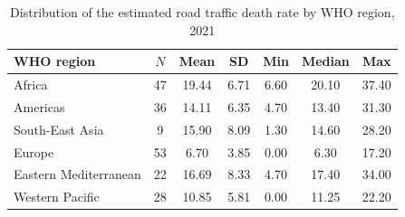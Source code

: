 \begin{table}[t]
\centering
\begin{threeparttable}
\caption{Distribution of the estimated road traffic death rate by WHO region, 2021}
\label{tab:regions}
\begin{tabular}{lcccccc}
\toprule
WHO region & $N$ & Mean & SD & Min & Median & Max \\
\midrule
Africa & 47 & 19.44 & 6.71 & 6.60 & 20.10 & 37.40 \\
Americas & 36 & 14.11 & 6.35 & 4.70 & 13.40 & 31.30 \\
South-East Asia & 9 & 15.90 & 8.09 & 1.30 & 14.60 & 28.20 \\
Europe & 53 & 6.70 & 3.85 & 0.00 & 6.30 & 17.20 \\
Eastern Mediterranean & 22 & 16.69 & 8.33 & 4.70 & 17.40 & 34.00 \\
Western Pacific & 28 & 10.85 & 5.81 & 0.00 & 11.25 & 22.20 \\
\bottomrule
\end{tabular}
\end{threeparttable}
\end{table}
